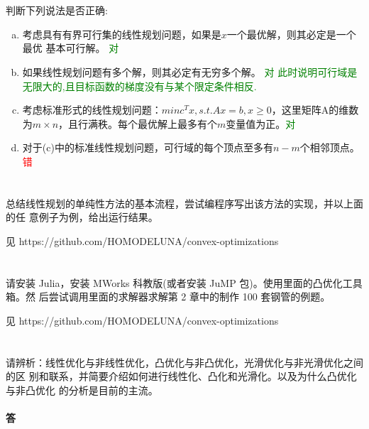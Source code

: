 \documentclass[a4paper]{article}
\begin{document}
\section{}
判断下列说法是否正确:
\begin{enumerate}[a)]
    \item 考虑具有有界可行集的线性规划问题，如果是$x$一个最优解，则其必定是一个最优
基本可行解。 \textcolor{green}{对}
\item 如果线性规划问题有多个解，则其必定有无穷多个解。 \textcolor{green}{对 此时说明可行域是无限大的,且目标函数的梯度没有与某个限定条件相反.}
\item 考虑标准形式的线性规划问题：$min c^Tx, s. t. Ax = b, x \geq 0$，这里矩阵A的维数为$m \times n$，且行满秩。每个最优解上最多有个$m$变量值为正。\textcolor{green}{对}
\item 对于(c)中的标准线性规划问题，可行域的每个顶点至多有$n-m$个相邻顶点。\textcolor{red}{错}
\end{enumerate}

\section{}

总结线性规划的单纯性方法的基本流程，尝试编程序写出该方法的实现，并以上面的任
意例子为例，给出运行结果。

见 https://github.com/HOMODELUNA/convex-optimizations

\section{}
请安装 Julia，安装 MWorks 科教版(或者安装 JuMP 包)。使用里面的凸优化工具箱。然
后尝试调用里面的求解器求解第 2 章中的制作 100 套钢管的例题。

见 https://github.com/HOMODELUNA/convex-optimizations
\section{}

请辨析：线性优化与非线性优化，凸优化与非凸优化，光滑优化与非光滑优化之间的区
别和联系，并简要介绍如何进行线性化、凸化和光滑化。以及为什么凸优化与非凸优化
的分析是目前的主流。

\paragraph{答}
\end{document}
